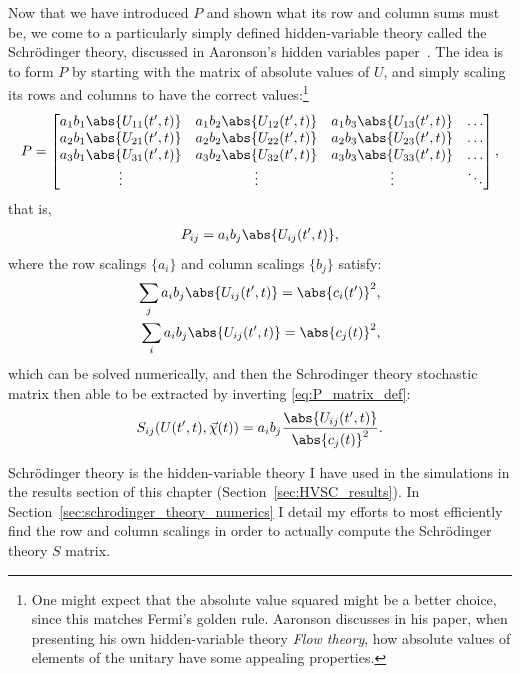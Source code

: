 Now that we have introduced $P$ and shown what its row and column sums must be, we come to a particularly simply defined hidden-variable theory called the Schr\"odinger theory, discussed in Aaronson's hidden variables paper~\cite{PhysRevA.71.032325}. The idea is to form $P$ by starting with the matrix of absolute values of $U$, and simply scaling its rows and columns to have the correct values:\footnote{One might expect that the absolute value squared might be a better choice, since this matches Fermi's golden rule. Aaronson discusses in his paper, when presenting his own hidden-variable theory \emph{Flow theory}, how absolute values of elements of the unitary have some appealing properties.}
\begin{align}
P = \left[\begin{matrix}
a_1b_1\abs{U_{11}(t^\prime, t)} & a_1b_2\abs{U_{12}(t^\prime, t)} & a_1b_3\abs{U_{13}(t^\prime, t)}&\hdots\\
a_2b_1\abs{U_{21}(t^\prime, t)} & a_2b_2\abs{U_{22}(t^\prime, t)} & a_2b_3\abs{U_{23}(t^\prime, t)}&\hdots\\
a_3b_1\abs{U_{31}(t^\prime, t)} & a_3b_2\abs{U_{32}(t^\prime, t)} & a_3b_3\abs{U_{33}(t^\prime, t)}&\hdots\\
\vdots & \vdots & \vdots & \ddots
\end{matrix}\right],
\end{align}
that is,
\begin{align}
P_{ij} = a_i b_j \abs{U_{ij}(t^\prime, t)},
\end{align}
where the row scalings $\{a_i\}$ and column scalings $\{b_j\}$ satisfy:
\begin{align}
\sum_j a_i b_j \abs{U_{ij}(t^\prime, t)} = \abs{c_i(t^\prime)}^2,\label{eq:a_scalings}\\
\sum_i a_i b_j \abs{U_{ij}(t^\prime, t)} = \abs{c_j(t)}^2\label{eq:b_scalings},
\end{align}
which can be solved numerically, and then the Schrodinger theory stochastic matrix then able to be extracted by inverting \eqref{eq:P_matrix_def}:
\begin{align}\label{eq:schrodinger_S_matrix}
S_{ij}(U(t^\prime, t), \vec\chi(t))
= a_i b_j \frac{\abs{U_{ij}(t^\prime, t)}}{\abs{c_j(t)}^2}.
\end{align}

Schr\"odinger theory is the hidden-variable theory I have used in the simulations in the results section of this chapter (Section~\ref{sec:HVSC_results}). In Section~\ref{sec:schrodinger_theory_numerics} I detail my efforts to most efficiently find the row and column scalings in order to actually compute the Schr\"odinger theory $S$ matrix.

